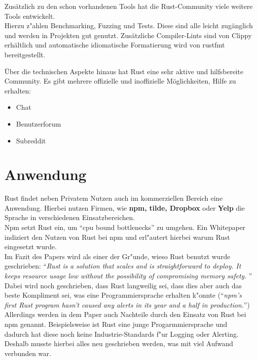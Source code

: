 Zusätzlich zu den schon vorhandenen Tools hat die Rust-Community viele weitere Tools  entwickelt.\\
Hierzu z"ahlen Benchmarking, Fuzzing und Tests. Diese sind alle leicht zugänglich und werden in Projekten gut genutzt. Zusätzliche Compiler-Lints sind von Clippy erhältlich und automatische idiomatische Formatierung wird von rustfmt bereitgestellt.

Über die technischen Aspekte hinaus hat Rust eine sehr aktive und hilfsbereite Community. Es gibt mehrere offizielle und inoffizielle Möglichkeiten, Hilfe zu erhalten:
\begin{itemize}
    \item  Chat \autocite{rust-discord}
    \item Benutzerforum \autocite{rust-user-forum}
    \item Subreddit \autocite{rust-subreddit}
\end{itemize}

\section{Anwendung}
Rust findet neben Privatem Nutzen auch im kommerziellen Bereich eine Anwendung. Hierbei nutzen Firmen, wie \textbf{npm, tilde, Dropbox} oder \textbf{Yelp} die Sprache in verschiedenen Einsatzbereichen.\\
Npm setzt Rust ein, um \enquote{cpu bound bottlenecks} zu umgehen.
Ein Whitepaper indiziert den Nutzen von Rust bei npm und erl"autert hierbei warum Rust eingesetzt wurde.\\
Im Fazit des Papers wird als einer der Gr"unde, wieso Rust benutzt wurde geschrieben: \enquote{\textit{Rust is a solution that scales and is straightforward to deploy. It keeps resource usage low
        without the possibility of compromising memory safety. }}\autocite{rust-whitepaper-npm}
Dabei wird noch geschrieben, dass Rust langweilig sei, dass dies aber auch das beste Kompliment sei, was eine Programmiersprache erhalten k"onnte (\enquote{\textit{npm’s first Rust program hasn't
        caused any alerts in its year and a half
        in production.}}) \autocite{rust-whitepaper-npm}\\
Allerdings werden in dem Paper auch Nachteile durch den Einsatz von Rust bei npm genannt. Beispielsweise ist Rust eine junge Progarmmiersprache und dadurch hat diese noch keine Industrie-Standards f"ur Logging oder Alerting. Deshalb musste hierbei alles neu geschrieben werden, was mit viel Aufwand verbunden war.
